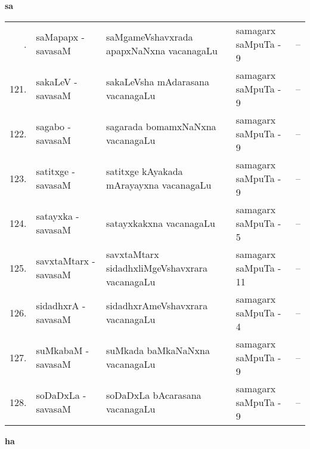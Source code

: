\centerline{\bf sa}

{\renewcommand{\arraystretch}{1.3}
\begin{longtable}{rl>{\raggedright}p{5.5cm}lc}
\hline
\endfirsthead
\hline
\endhead
\hline
\endfoot
\endlastfoot
120. & saMapapx - savasaM &  saMgameVshavxrada apapxNaNxna vacanagaLu & samagarx saMpuTa - 9 & --\\
121. & sakaLeV - savasaM & sakaLeVsha mAdarasana vacanagaLu & samagarx saMpuTa - 9 & --\\
122. & sagabo - savasaM & sagarada bomamxNaNxna vacanagaLu & samagarx saMpuTa - 9 & --\\
123. & satitxge - savasaM & satitxge kAyakada mArayayxna vacanagaLu & samagarx saMpuTa - 9 & --\\
124. & satayxka - savasaM & satayxkakxna vacanagaLu & samagarx saMpuTa - 5 & --\\
125. & savxtaMtarx - savasaM &  savxtaMtarx sidadhxliMgeVshavxrara vacanagaLu & samagarx saMpuTa - 11 & --\\
126. & sidadhxrA - savasaM & sidadhxrAmeVshavxrara vacanagaLu & samagarx saMpuTa - 4 & --\\
127. & suMkabaM - savasaM & suMkada baMkaNaNxna vacanagaLu & samagarx saMpuTa - 9 & --\\
128. & soDaDxLa - savasaM &  soDaDxLa bAcarasana vacanagaLu & samagarx saMpuTa - 9 & --\\
\hline
\end{longtable}}
\smallskip

\centerline{\bf ha}

